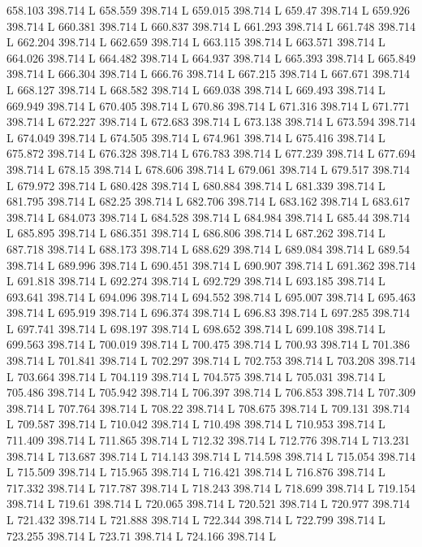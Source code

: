 658.103 398.714 L
658.559 398.714 L
659.015 398.714 L
659.47 398.714 L
659.926 398.714 L
660.381 398.714 L
660.837 398.714 L
661.293 398.714 L
661.748 398.714 L
662.204 398.714 L
662.659 398.714 L
663.115 398.714 L
663.571 398.714 L
664.026 398.714 L
664.482 398.714 L
664.937 398.714 L
665.393 398.714 L
665.849 398.714 L
666.304 398.714 L
666.76 398.714 L
667.215 398.714 L
667.671 398.714 L
668.127 398.714 L
668.582 398.714 L
669.038 398.714 L
669.493 398.714 L
669.949 398.714 L
670.405 398.714 L
670.86 398.714 L
671.316 398.714 L
671.771 398.714 L
672.227 398.714 L
672.683 398.714 L
673.138 398.714 L
673.594 398.714 L
674.049 398.714 L
674.505 398.714 L
674.961 398.714 L
675.416 398.714 L
675.872 398.714 L
676.328 398.714 L
676.783 398.714 L
677.239 398.714 L
677.694 398.714 L
678.15 398.714 L
678.606 398.714 L
679.061 398.714 L
679.517 398.714 L
679.972 398.714 L
680.428 398.714 L
680.884 398.714 L
681.339 398.714 L
681.795 398.714 L
682.25 398.714 L
682.706 398.714 L
683.162 398.714 L
683.617 398.714 L
684.073 398.714 L
684.528 398.714 L
684.984 398.714 L
685.44 398.714 L
685.895 398.714 L
686.351 398.714 L
686.806 398.714 L
687.262 398.714 L
687.718 398.714 L
688.173 398.714 L
688.629 398.714 L
689.084 398.714 L
689.54 398.714 L
689.996 398.714 L
690.451 398.714 L
690.907 398.714 L
691.362 398.714 L
691.818 398.714 L
692.274 398.714 L
692.729 398.714 L
693.185 398.714 L
693.641 398.714 L
694.096 398.714 L
694.552 398.714 L
695.007 398.714 L
695.463 398.714 L
695.919 398.714 L
696.374 398.714 L
696.83 398.714 L
697.285 398.714 L
697.741 398.714 L
698.197 398.714 L
698.652 398.714 L
699.108 398.714 L
699.563 398.714 L
700.019 398.714 L
700.475 398.714 L
700.93 398.714 L
701.386 398.714 L
701.841 398.714 L
702.297 398.714 L
702.753 398.714 L
703.208 398.714 L
703.664 398.714 L
704.119 398.714 L
704.575 398.714 L
705.031 398.714 L
705.486 398.714 L
705.942 398.714 L
706.397 398.714 L
706.853 398.714 L
707.309 398.714 L
707.764 398.714 L
708.22 398.714 L
708.675 398.714 L
709.131 398.714 L
709.587 398.714 L
710.042 398.714 L
710.498 398.714 L
710.953 398.714 L
711.409 398.714 L
711.865 398.714 L
712.32 398.714 L
712.776 398.714 L
713.231 398.714 L
713.687 398.714 L
714.143 398.714 L
714.598 398.714 L
715.054 398.714 L
715.509 398.714 L
715.965 398.714 L
716.421 398.714 L
716.876 398.714 L
717.332 398.714 L
717.787 398.714 L
718.243 398.714 L
718.699 398.714 L
719.154 398.714 L
719.61 398.714 L
720.065 398.714 L
720.521 398.714 L
720.977 398.714 L
721.432 398.714 L
721.888 398.714 L
722.344 398.714 L
722.799 398.714 L
723.255 398.714 L
723.71 398.714 L
724.166 398.714 L
